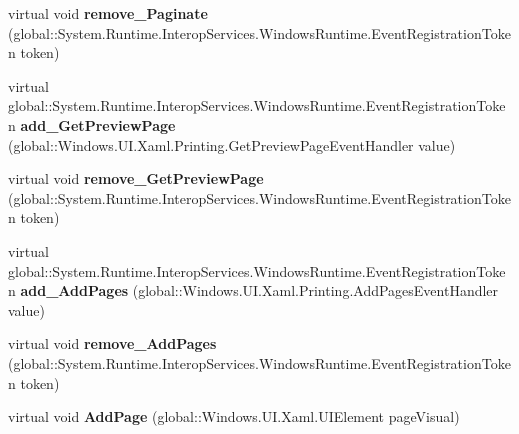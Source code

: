 \begin{DoxyCompactItemize}
virtual void {\bfseries remove\+\_\+\+Paginate} (global\+::\+System.\+Runtime.\+Interop\+Services.\+Windows\+Runtime.\+Event\+Registration\+Token token)
\item 
\mbox{\label{class_windows_1_1_u_i_1_1_xaml_1_1_printing_1_1_print_document_a7f3e8c94058352a6d36e6c86a1f14425}} 
virtual global\+::\+System.\+Runtime.\+Interop\+Services.\+Windows\+Runtime.\+Event\+Registration\+Token {\bfseries add\+\_\+\+Get\+Preview\+Page} (global\+::\+Windows.\+U\+I.\+Xaml.\+Printing.\+Get\+Preview\+Page\+Event\+Handler value)
\item 
\mbox{\label{class_windows_1_1_u_i_1_1_xaml_1_1_printing_1_1_print_document_a049493be7cb40ba87e23a1fff9cca61a}} 
virtual void {\bfseries remove\+\_\+\+Get\+Preview\+Page} (global\+::\+System.\+Runtime.\+Interop\+Services.\+Windows\+Runtime.\+Event\+Registration\+Token token)
\item 
\mbox{\label{class_windows_1_1_u_i_1_1_xaml_1_1_printing_1_1_print_document_abcf27815570562c0335caae5ab74ff34}} 
virtual global\+::\+System.\+Runtime.\+Interop\+Services.\+Windows\+Runtime.\+Event\+Registration\+Token {\bfseries add\+\_\+\+Add\+Pages} (global\+::\+Windows.\+U\+I.\+Xaml.\+Printing.\+Add\+Pages\+Event\+Handler value)
\item 
\mbox{\label{class_windows_1_1_u_i_1_1_xaml_1_1_printing_1_1_print_document_ac0b62cd4a9c0d95589b9afcb1f7a0082}} 
virtual void {\bfseries remove\+\_\+\+Add\+Pages} (global\+::\+System.\+Runtime.\+Interop\+Services.\+Windows\+Runtime.\+Event\+Registration\+Token token)
\item 
\mbox{\label{class_windows_1_1_u_i_1_1_xaml_1_1_printing_1_1_print_document_ab73e0795893f75e4c311206a05f5604e}} 
virtual void {\bfseries Add\+Page} (global\+::\+Windows.\+U\+I.\+Xaml.\+U\+I\+Element page\+Visual)
\item 
\mbox{\label{class_windows_1_1_u_i_1_1_xaml_1_1_printing_1_1_print_document_a86b1ab90c519769c55161873f7402602}} 

\end{DoxyCompactItemize}
